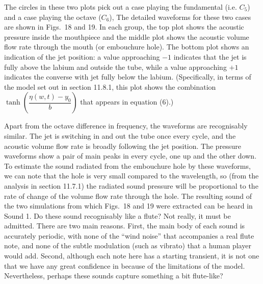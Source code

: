 
  The circles in these two plots pick out a case playing the fundamental (i.e. 
  $C_5$) and a case playing the octave ($C_6$), The detailed waveforms for 
  these two cases are shown in Figs.\ 18 and 19. In each group, the top plot 
  shows the acoustic pressure inside the mouthpiece and the middle plot shows 
  the acoustic volume flow rate through the mouth (or embouchure hole). The 
  bottom plot shows an indication of the jet position: a value approaching $-1$ 
  indicates that the jet is fully above the labium and outside the tube, while 
  a value approaching $+1$ indicates the converse with jet fully below the 
  labium. (Specifically, in terms of the model set out in section 11.8.1, this 
  plot shows the combination $\tanh \left( \dfrac{\eta(w,t)-y_0}{b} \right)$ 
  that appears in equation (6).) 



  Apart from the octave difference in frequency, the waveforms are recognisably 
  similar. The jet is switching in and out the tube once every cycle, and the 
  acoustic volume flow rate is broadly following the jet position. The pressure 
  waveforms show a pair of main peaks in every cycle, one up and the other 
  down. To estimate the sound radiated from the embouchure hole by these 
  waveforms, we can note that the hole is very small compared to the 
  wavelength, so (from the analysis in section 11.7.1) the radiated sound 
  pressure will be proportional to the rate of change of the volume flow rate 
  through the hole. The resulting sound of the two simulations from which 
  Figs.\ 18 and 19 were extracted can be heard in Sound 1. Do these sound 
  recognisably like a flute? Not really, it must be admitted. There are two 
  main reasons. First, the main body of each sound is accurately periodic, with 
  none of the “wind noise” that accompanies a real flute note, and none of the 
  subtle modulation (such as vibrato) that a human player would add. Second, 
  although each note here has a starting transient, it is not one that we have 
  any great confidence in because of the limitations of the model. 
  Nevertheless, perhaps these sounds capture something a bit flute-like? 

